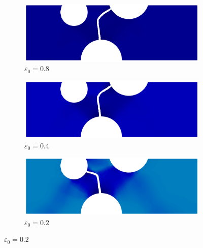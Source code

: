 \begin{figure}[!htb]
  \centering
  \begin{subfigure}[b]{0.3\textwidth}
    \centering
    \includegraphics[width=\textwidth,scale=0.5]{Chapter5/figures/3pb/beta_0.1_e0_0.8}
    \caption{$\varepsilon_0=0.8$}
  \end{subfigure}
  \begin{subfigure}[b]{0.3\textwidth}
    \centering
    \includegraphics[width=\textwidth,scale=0.5]{Chapter5/figures/3pb/beta_0.1_e0_0.4}
    \caption{$\varepsilon_0=0.4$}
  \end{subfigure}
  \begin{subfigure}[b]{0.3\textwidth}
    \centering
    \includegraphics[width=\textwidth,scale=0.5]{Chapter5/figures/3pb/beta_0.1_e0_0.2}
    \caption{$\varepsilon_0=0.2$}
  \end{subfigure}
  

\end{figure}
